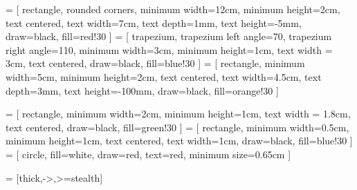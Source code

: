  = [
    rectangle, rounded corners, 
    minimum width=12cm, 
    minimum height=2cm,
    text centered, 
    text width=7cm, 
    text depth=1mm,
    text height=-5mm,
    draw=black, 
    fill=red!30
]
 = [
    trapezium, trapezium left angle=70, trapezium right angle=110, minimum width=3cm,
    minimum height=1cm, text width = 3cm, text centered, draw=black, fill=blue!30
]
 = [
    rectangle, 
    minimum width=5cm, 
    minimum height=2cm, 
    text centered, 
    text width=4.5cm, 
    text depth=3mm,
    text height=-100mm,
    draw=black, 
    fill=orange!30
]

 = [
    rectangle,
    minimum width=2cm, 
    minimum height=1cm, 
    text width = 1.8cm, 
    text centered, 
    draw=black, 
    fill=green!30
]
 = [
    rectangle, 
    minimum width=0.5cm, 
    minimum height=1cm, 
    text centered, 
    text width=1cm, 
    draw=black, 
    fill=blue!30
]
 = [
    circle, 
    fill=white, 
    draw=red, 
    text=red, 
    minimum size=0.65cm
]

 = [thick,->,>=stealth]



